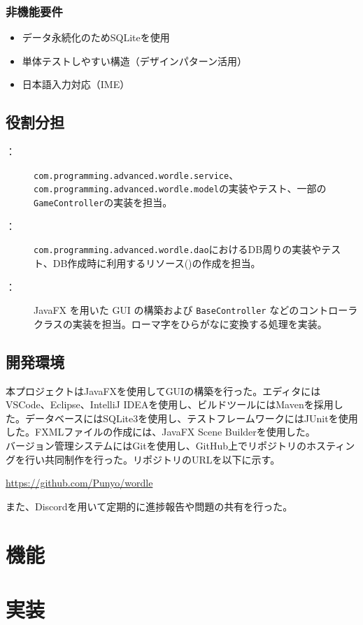 \documentclass[a4j]{ujarticle}
\begin{document}
\subsubsection{非機能要件}
\begin{itemize}
  \item データ永続化のためSQLiteを使用
  \item 単体テストしやすい構造（デザインパターン活用）
  \item 日本語入力対応（IME）
\end{itemize}
\subsection{役割分担}
\begin{description}
  \item[：]\texttt{com.programming.advanced.wordle.service}、\texttt{com.programming.advanced.wordle.model}の実装やテスト、一部の\texttt{GameController}の実装を担当。
  \item[：]\texttt{com.programming.advanced.wordle.dao}におけるDB周りの実装やテスト、DB作成時に利用するリソース()の作成を担当。
  \item[：] JavaFX を用いた GUI の構築および \texttt{BaseController} などのコントローラクラスの実装を担当。ローマ字をひらがなに変換する処理を実装。
\end{description}
\subsection{開発環境}
本プロジェクトはJavaFXを使用してGUIの構築を行った。エディタにはVSCode、Eclipse、IntelliJ IDEAを使用し、ビルドツールにはMavenを採用した。データベースにはSQLite3を使用し、テストフレームワークにはJUnitを使用した。FXMLファイルの作成には、JavaFX Scene Builderを使用した。\\
バージョン管理システムにはGitを使用し、GitHub上でリポジトリのホスティングを行い共同制作を行った。リポジトリのURLを以下に示す。
\begin{center}
  \url{https://github.com/Punyo/wordle}
\end{center}
また、Discordを用いて定期的に進捗報告や問題の共有を行った。
\section{機能}
\section{実装}
\end{document}
